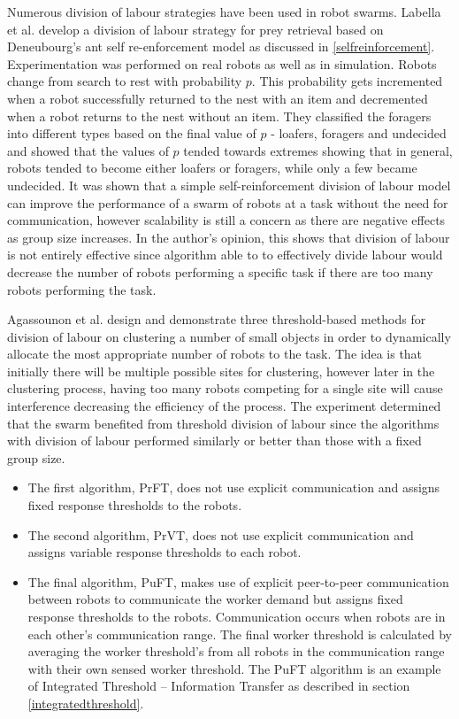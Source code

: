 Numerous division of labour strategies have been used in robot swarms. Labella et al. \cite{labella2006division} develop a division of labour strategy for prey retrieval based on Deneubourg's ant self re-enforcement model as discussed in \ref{selfreinforcement}. Experimentation was performed on real robots as well as in simulation. Robots change from search to rest with probability $p$. This probability gets incremented when a robot successfully returned to the nest with an item and decremented when a robot returns to the nest without an item. They classified the foragers into different types based on the final value of $p$ - loafers, foragers and undecided and showed that the values of $p$ tended towards extremes showing that in general, robots tended to become either loafers or foragers, while only a few became undecided. It was shown that a simple self-reinforcement division of labour model can improve the performance of a swarm of robots at a task without the need for communication, however scalability is still a concern as there are negative effects as group size increases. In the author's opinion, this shows that division of labour is not entirely effective since algorithm able to to effectively divide labour would decrease the number of robots performing a specific task if there are too many robots performing the task.

Agassounon et al. design and demonstrate three threshold-based methods for division of labour\cite{agassounon2002efficiency} on clustering a number of small objects in order to dynamically allocate the most appropriate number of robots to the task. The idea is that initially there will be multiple possible sites for clustering, however later in the clustering process, having too many robots competing for a single site will cause interference decreasing the efficiency of the process. The experiment determined that the swarm benefited from threshold division of labour since the algorithms with division of labour performed similarly or better than those with a fixed group size. 

\begin{itemize}
\item The first algorithm, PrFT, does not use explicit communication and assigns fixed response thresholds to the robots.
\item The second algorithm, PrVT, does not use explicit communication and assigns variable response thresholds to each robot. 
\item The final algorithm, PuFT, makes use of explicit peer-to-peer communication between robots to communicate the worker demand but assigns fixed response thresholds to the robots.  Communication occurs when robots are in each other's communication range. The final worker threshold is calculated by averaging the worker threshold's from all robots in the communication range with their own sensed worker threshold. 
The PuFT algorithm is an example of Integrated Threshold -- Information Transfer as described in section \ref{integratedthreshold}.
\end{itemize}

